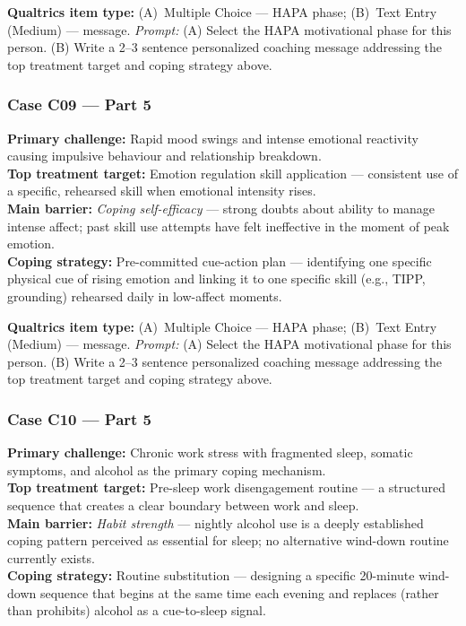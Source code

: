 \documentclass[11pt,a4paper]{article}
\newcommand{\haparesponse}[1]{\begin{tcolorbox}[colback=ResponseBG,colframe=GoldAmber,boxrule=0.6pt,arc=1.5mm,left=6pt,right=6pt,top=5pt,bottom=5pt]\small\textbf{\color{GoldAmber}Qualtrics item type:} (A)~Multiple Choice --- HAPA phase; (B)~Text Entry (Medium) --- message. \quad \textit{Prompt:} #1\end{tcolorbox}}
\begin{document}
\haparesponse{(A) Select the HAPA motivational phase for this person. (B) Write a 2--3 sentence personalized coaching message addressing the top treatment target and coping strategy above.}

\vspace{0.4em}

\subsubsection*{Case C09 --- Part 5}

\begin{contextbox}
\small
\textbf{Primary challenge:} Rapid mood swings and intense emotional reactivity causing impulsive behaviour and relationship breakdown.\\
\textbf{Top treatment target:} Emotion regulation skill application --- consistent use of a specific, rehearsed skill when emotional intensity rises.\\
\textbf{Main barrier:} \textit{Coping self-efficacy} --- strong doubts about ability to manage intense affect; past skill use attempts have felt ineffective in the moment of peak emotion.\\
\textbf{Coping strategy:} Pre-committed cue-action plan --- identifying one specific physical cue of rising emotion and linking it to one specific skill (e.g., TIPP, grounding) rehearsed daily in low-affect moments.
\end{contextbox}

\haparesponse{(A) Select the HAPA motivational phase for this person. (B) Write a 2--3 sentence personalized coaching message addressing the top treatment target and coping strategy above.}

\vspace{0.4em}

\subsubsection*{Case C10 --- Part 5}

\begin{contextbox}
\small
\textbf{Primary challenge:} Chronic work stress with fragmented sleep, somatic symptoms, and alcohol as the primary coping mechanism.\\
\textbf{Top treatment target:} Pre-sleep work disengagement routine --- a structured sequence that creates a clear boundary between work and sleep.\\
\textbf{Main barrier:} \textit{Habit strength} --- nightly alcohol use is a deeply established coping pattern perceived as essential for sleep; no alternative wind-down routine currently exists.\\
\textbf{Coping strategy:} Routine substitution --- designing a specific 20-minute wind-down sequence that begins at the same time each evening and replaces (rather than prohibits) alcohol as a cue-to-sleep signal.
\end{contextbox}
\end{document}

